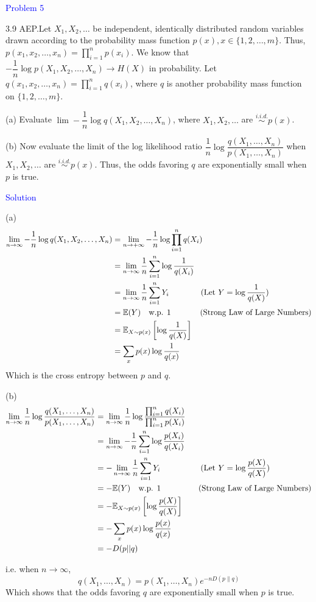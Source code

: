 \textcolor{blue}{Problem 5}

3.9 AEP.\quad Let $X_1,X_2,\ldots$ be independent, identically distributed random variables drawn according to the probability mass function $p(x),x\in\{1,2,\ldots,m\}$. Thus, $p(x_{1},x_{2},\ldots,x_{n})=\prod_{i=1}^{n}p(x_{i})$. We know that $-\dfrac1n\log p(X_1,X_2,\ldots,X_n)\to H(X)$ in probability. Let $q(x_1,x_2,\ldots,x_n)=\prod_{i=1}^nq(x_i)$, where $q$ is another probability mass function on $\{1,2,\ldots,m\}$.

(a) Evaluate $\lim-\dfrac1n\log q(X_1,X_2,\ldots,X_n)$, where $X_1,X_2,\ldots$ are $\stackrel{i.i.d.}{\sim} p(x)$.

(b) Now evaluate the limit of the log likelihood ratio
$\dfrac{1}{n}\log\dfrac{q(X_{1},\ldots,X_{n})}{p(X_{1},\ldots,X_{n})}$ when $X_1,X_{2},\ldots$ are $\stackrel{i.i.d.}{\sim} p(x).$ Thus, the
odds favoring $q$ are exponentially small when $p$ is true.

\textcolor{blue}{Solution}

(a)
\begin{align*}
\lim_{n\to\infty}-\dfrac{1}{n}\log q(X_1,X_2,\ldots,X_n) &= \lim_{n\to+\infty}-\dfrac{1}{n}\log\prod\limits_{i=1}^nq(X_i) \\
&= \lim_{n\to\infty}\dfrac{1}{n}\sum\limits_{i=1}^n\log \frac{1}{q(X_i)} \\
&= \lim_{n\to\infty}\dfrac{1}{n}\sum\limits_{i=1}^nY_i \text{\quad\quad\quad\quad (Let $Y=\log\dfrac{1}{q(X)}$)} \\
&= \mathbb{E}(Y) \text{\quad w.p. 1 \quad\quad\quad\ (Strong Law of Large Numbers)} \\
&= \mathbb{E}_{X\sim p(x)}\left[\log\dfrac{1}{q(X)}\right] \\
&= \sum\limits_{x} p(x)\log\dfrac{1}{q(x)}
\end{align*}
Which is the cross entropy between $p$ and $q$.

(b)
\begin{align*}
\lim_{n\to\infty} \dfrac{1}{n}\log\dfrac{q(X_{1},\ldots,X_{n})}{p(X_{1},\ldots,X_{n})} &= \lim_{n\to\infty} \dfrac{1}{n}\log\dfrac{\prod_{i=1}^nq(X_i)}{\prod_{i=1}^np(X_i)} \\
&= \lim_{n\to\infty} -\dfrac{1}{n}\sum\limits_{i=1}^n\log\dfrac{p(X_i)}{q(X_i)} \\
&= -\lim_{n\to\infty} \dfrac{1}{n}\sum\limits_{i=1}^nY_i \text{\quad\quad\quad\quad\quad (Let $Y=\log\dfrac{p(X)}{q(X)}$)} \\
&= -\mathbb{E}(Y) \text{\quad w.p. 1 \quad\quad\quad\quad\ (Strong Law of Large Numbers)} \\
&= -\mathbb{E}_{X\sim p(x)}\left[\log\frac{p(X)}{q(X)}\right] \\
&= -\sum\limits_{x} p(x)\log\frac{p(x)}{q(x)} \\
&= -D(p||q)
\end{align*}

i.e. when $n\to\infty$,
$$q(X_{1},\ldots,X_{n}) = p(X_{1},\ldots,X_{n})e^{-nD(p\|q)}$$
Which shows that the odds favoring $q$ are exponentially small when $p$ is true.